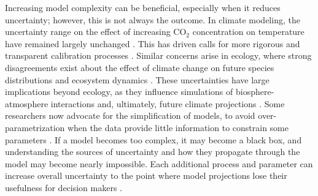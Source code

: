 \documentclass[11pt]{article}
\begin{document}
Increasing model complexity can be beneficial, especially when it reduces uncertainty; however, this is not always the outcome. In climate modeling, the uncertainty range on the effect of increasing CO$_{2}$ concentration on temperature have remained largely unchanged \citep{Zelinka2020}. This has driven calls for more rigorous and transparent calibration processes \citep{balaji2022general}. Similar concerns arise in ecology, where strong disagreements exist about the effect of climate change on future species distributions \citep{Cheaib2012} and ecosystem dynamics \citep{Lovenduski2017}.
These uncertainties have large implications beyond ecology, as they influence simulations of biosphere-atmosphere interactions and, ultimately, future climate projections \citep{Bonan2018, simpson2025confronting}.
Some researchers now advocate for the simplification of models, to avoid over-parametrization when the data provide little information to constrain some parameters \citep{Wang2017, Harrison2021}. %
If a model becomes too complex, it may become a black box, and understanding the sources of uncertainty and how they propagate through the model may become nearly impossible.
Each additional process and parameter can increase overall uncertainty to the point where model projections lose their usefulness for decision makers \citep{Saltelli2020}. %
\end{document}
